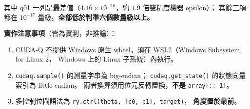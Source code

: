 \documentclass[11pt,a4paper]{ctexart}
\begin{document}
\begin{table}[t]
\centering
\caption{交叉驗證：每一個量子電路結果都對獨立實作比對。判準為
\(10^{- 10}\)，四條電路中最差的是
\(4.16 \times 10^{- 16}\)，約為雙精度機器 epsilon 的 \(1.9\)
倍。}
\end{table}


其中 q01 一列是最差值（\(4.16 \times 10^{- 16}\)，約 \(1.9\)
倍雙精度機器 epsilon）； 其餘三項都在 \(10^{- 17}\)
量級。\textbf{全部低於判準六個數量級以上。}

\textbf{實作注意事項}（皆為實測，非推論）：

\begin{enumerate}
\item
  CUDA-Q 不提供 Windows 原生 wheel，須在 WSL2（Windows Subsystem for
  Linux 2， Windows 上的 Linux 子系統）內執行。
\item
  \texttt{cudaq.sample()} 的測量字串為 big-endian；
  \texttt{cudaq.get\_\allowbreak state()} 的狀態向量索引為 little-endian。
  兩者換算須用位元反轉置換，\textbf{不是} \texttt{array{[}::-1{]}}。
\item
  多控制位閘語法為 \texttt{ry.ctrl(theta,\ {[}c0,\ c1{]},\ target)}，
  \textbf{角度置於最前}。
\end{enumerate}
\end{document}
